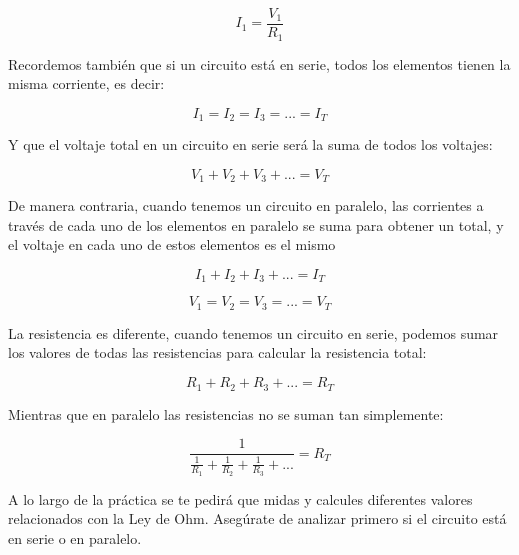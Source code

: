 		\begin{equation}
			I_1 = \frac{V_1}{R_1}
		\end{equation}

		Recordemos también que si un circuito está en serie, todos los elementos tienen la misma corriente, es decir:

		\begin{equation}
			I_1 = I_2 = I_3 = ... = I_T
		\end{equation}

		Y que el voltaje total en un circuito en serie será la suma de todos los voltajes:

		\begin{equation}
			V_1 + V_2 + V_3 + ... = V_T
		\end{equation}

		De manera contraria, cuando tenemos un circuito en paralelo, las corrientes a través de cada uno de los elementos en paralelo se suma para obtener un total, y el voltaje en cada uno de estos elementos es el mismo

		\begin{equation}
			I_1 + I_2 + I_3 + ... = I_T
		\end{equation}

		\begin{equation}
			V_1 = V_2 = V_3 = ... = V_T
		\end{equation}

		La resistencia es diferente, cuando tenemos un circuito en serie, podemos sumar los valores de todas las resistencias para calcular la resistencia total:

		\begin{equation}
			R_1 + R_2 + R_3 + ... = R_T
		\end{equation}

		Mientras que en paralelo las resistencias no se suman tan simplemente:

		\begin{equation}
			\frac{1}{\frac{1}{R_1} + \frac{1}{R_2} + \frac{1}{R_3} + ...} = R_T
		\end{equation}

		A lo largo de la práctica se te pedirá que midas y calcules diferentes valores relacionados con la Ley de Ohm. Asegúrate de analizar primero si el circuito está en serie o en paralelo.


